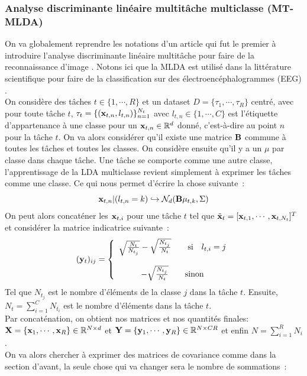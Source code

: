\documentclass[12pt]{article}
\begin{document}
\subsubsection{Analyse discriminante linéaire multitâche multiclasse (MT-MLDA)}
On va globalement reprendre les notations d'un article qui fut le premier à introduire l'analyse discriminante linéaire multitâche pour faire de la reconnaissance d'image \cite{MT-LDA}. Notons ici que la MLDA est utilisé dans la littérature scientifique pour faire de la classification sur des électroencéphalogrammes (EEG) \cite{EEG_LDA}.\\
On considère des tâches $t \in \{1, \cdots, R\}$ et un dataset $D = \{\tau_{1}, \cdots, \tau_{R}\}$ centré, avec pour toute tâche $t$, $\tau_t = \{({\bf x}_{t, n}, l_{t, n})\}^{N_t}_{n = 1}$ avec $l_{t, n} \in \{1, \cdots, C\}$ est l'étiquette d'appartenance à une classe pour un ${\bf x}_{t, n} \in \mathbb{R}^d$ donné, c'est-à-dire au point $n$ pour la tâche $t$. On va alors considérer qu'il existe une matrice ${\bf B}$ commune à toutes les tâches et toutes les classes. On considère ensuite qu'il y a un $\mu$ par classe dans chaque tâche. Une tâche se comporte comme une autre classe, l'apprentissage de la LDA multiclasse revient simplement à exprimer les tâches comme une classe. Ce qui nous permet d'écrire la chose suivante~:
$$
{\bf x}_{t, n} | (l_{t, n} = k) \hookrightarrow \mathcal{N}_d({\bf B}\mu_{t, k}, \Sigma)
$$
On peut alors concaténer les ${\bf x}_{t, i}$ pour une tâche $t$ tel que $\tilde{\bf x}_t = [{\bf x}_{t, 1}, \cdots, {\bf x}_{t, N_t}]^T$ et considérer la matrice indicatrice suivante~:\\
$$
({\bf y}_t)_{ij} = \left\{ 
\begin{array}{cc}
\sqrt{\frac{N_t}{N_{t_j}}} - \sqrt{\frac{N_{t_j}}{N_t}} \quad \quad \text{si} \quad l_{t, i} = j\\
\\
-\sqrt{\frac{N_{t_j}}{N_t}} \quad \quad \text{sinon}
\end{array}
\right.
$$
Tel que $N_{t_j}$ est le nombre d'éléments de la classe $j$ dans la tâche $t$. Ensuite, $N_t = \sum_{i = 1}^{C} N_{t_i}$ est le nombre d'éléments dans la tâche $t$.\\
Par concaténation, on obtient nos matrices et nos quantités finales: ${\bf X} = \{{\bf x}_1, \cdots, {\bf x}_R\} \in \mathbb{R}^{N \times d}$ et ${\bf Y} = \{ {\bf y}_1, \cdots, {\bf y}_R\} \in \mathbb{R}^{N \times CR}$ et enfin $N = \sum_{i = 1}^{R} N_i$.\\
On va alors chercher à exprimer des matrices de covariance comme dans la section d'avant, la seule chose qui va changer sera le nombre de sommations~:\\
\end{document}
